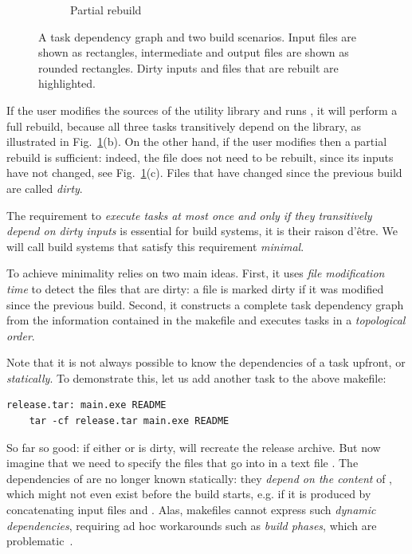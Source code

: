 \begin{figure}[h]
\begin{subfigure}[b]{0.32\linewidth}
\caption{Partial rebuild}
\end{subfigure}
\caption{A task dependency graph and two build scenarios. Input files are shown as
rectangles, intermediate and output files are shown as rounded rectangles. Dirty
inputs and files that are rebuilt are highlighted.
\label{fig-make}}
\end{figure}

If the user modifies the sources of the utility library and runs \Make, it will
perform a full rebuild, because all three tasks transitively depend on the
library, as illustrated in Fig.~\ref{fig-make}(b). On the other hand, if the
user modifies  then a partial rebuild is sufficient: indeed, the
file  does not need to be rebuilt, since its inputs have not
changed, see Fig.~\ref{fig-make}(c). Files that have changed since the previous
build are called \emph{dirty}.

The requirement to \emph{execute tasks at most once and only if they transitively
depend on dirty inputs} is essential for build systems, it is their raison
d'\^etre. We will call build systems that satisfy this requirement \emph{minimal}.

To achieve minimality \Make relies on two main ideas. First, it uses \emph{file
modification time} to detect the files that are dirty: a file is marked dirty if
it was modified since the previous build. Second, it constructs a complete task
dependency graph from the information contained in the makefile and executes
tasks in a \emph{topological order}.

Note that it is not always possible to know the dependencies of a task upfront,
or \emph{statically}. To demonstrate this, let us add another task to the above
makefile:

\vspace{1mm}
\begin{verbatim}
release.tar: main.exe README
    tar -cf release.tar main.exe README
\end{verbatim}
\vspace{1mm}

\noindent
So far so good: if either  or  is dirty, \Make will
recreate the release archive. But now imagine that we need to specify the files
that go into  in a text file . The dependencies
of  are no longer known statically: they \emph{depend on the
content} of , which might not even exist before the build
starts, e.g. if it is produced by concatenating input files 
and . Alas, makefiles cannot express such \emph{dynamic
dependencies}, requiring ad hoc workarounds such as \emph{build phases}, which
are problematic~\cite{hadrian}.

